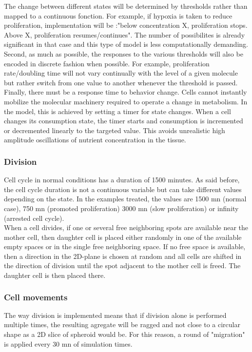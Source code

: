 \documentclass[11pt,a4paper]{article}
\begin{document}
The change between different states will be determined by thresholds rather than mapped to a continuous fonction. For example, if hypoxia is taken to reduce proliferation, implementation will be :"below concentration X, proliferation stops. Above X, proliferation resumes/continues". The number of possibilites is already significant in that case and this type of model is less computationally demanding.\\

Second, as much as possible, the responses to the various thresholds will also be encoded in discrete fashion when possible. For example, proliferation rate/doubling time will not vary continually with the level of a given molecule but rather switch from one value to another whenever the threshold is passed.\\

Finally, there must be a response time to behavior change. Cells cannot instantly mobilize the molecular machinery required to operate a change in metabolism. In the model, this is achieved by setting a timer for state changes. When a cell changes its consumption state, the timer starts and consumption is incremented or decremented linearly to the targeted value. This avoids unrealistic high amplitude oscillations of nutrient concentration in the tissue.\\
 
\subsubsection{Division}
Cell cycle in normal conditions has a duration of 1500 minutes. As said before, the cell cycle duration is not a continuous variable but can take different values depending on the state. In the examples treated, the values are 1500 mn (normal case), 750 mn (promoted proliferation) 3000 mn (slow proliferation) or infinity (arrested cell cycle).\\

When a cell divides, if one or several free neighboring spots are available near the mother cell, then daughter cell is placed either randomly in one of the available empty spaces or in the single free neighboring space. If no free space is available, then a direction in the 2D-plane is chosen at random and all cells are shifted in the direction of division until the spot adjacent to the mother cell is freed. The daughter cell is then placed there.\\

\subsubsection{Cell movements}
The way division is implemented means that if division alone is performed multiple times, the resulting agregate will be ragged and not close to a circular shape as a 2D slice of spheroid would be. For this reason, a round of "migration" is applied every 30 mn of simulation times.\\
\end{document}
